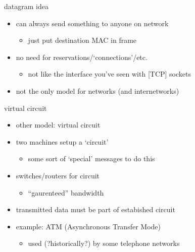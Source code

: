\begin{frame}{datagram idea}
    \begin{itemize}
    \item can always send something to anyone on network
        \begin{itemize}
        \item just put destination MAC in frame
        \end{itemize}
    \item no need for reservations/`connections'/etc.
        \begin{itemize}
        \item not like the interface you've seen with [TCP] sockets
        \end{itemize}
    \vspace{.5cm}
    \item not the only model for networks (and internetworks)
    \end{itemize}
\end{frame}

\begin{frame}{virtual circuit}
    \begin{itemize}
    \item other model: virtual circuit
    \item two machines setup a `circuit'
        \begin{itemize}
        \item some sort of `special' messages to do this
        \end{itemize}
    \item switches/routers  for circuit
        \begin{itemize}
        \item ``gaurenteed'' bandwidth
        \end{itemize}
    \item transmitted data must be part of estabished circuit
    \vspace{.5cm}
    \item example: ATM (Asynchronous Transfer Mode)
        \begin{itemize}
        \item used (?historically?) by some telephone networks
        \end{itemize}
    \end{itemize}
\end{frame}

